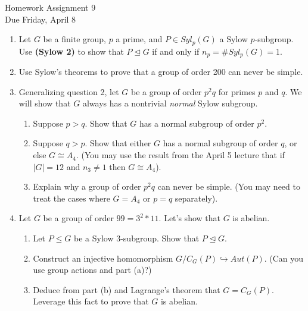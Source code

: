 \documentclass[11pt]{article}
\begin{document}
\begin{center}
\Large {Homework Assignment 9}\\
\small {Due Friday, April 8}
\end{center}
\begin{enumerate}
\item Let $G$ be a finite group, $p$ a prime, and $P\in Syl_p(G)$ a Sylow $p$-subgroup.  Use \textbf{(Sylow 2)} to show that $P\unlhd G$ if and only if $n_p = \#Syl_p(G) = 1$.
\item Use Sylow's theorems to prove that a group of order 200 can never be simple.
  \item{
  Generalizing question 2, let $G$ be a group of order $p^2q$ for primes $p$ and $q$.  We will show that $G$ always has a nontrivial \textit{normal} Sylow subgroup.
  \begin{enumerate}
    \item Suppose $p>q$.  Show that $G$ has a normal subgroup of order $p^2$.
    \item Suppose $q>p$.  Show that either $G$ has a normal subgroup of order $q$, or else $G\cong A_4$.  (You may use the result from the April 5 lecture that if $|G|=12$ and $n_3\not=1$ then $G\cong A_4$).
    \item Explain why a group of order $p^2q$ can never be simple.  (You may need to treat the cases where $G=A_4$ or $p=q$ separately).
  \end{enumerate}
  }
\item Let $G$ be a group of order $99 = 3^2 * 11$.  Let's show that $G$ is abelian.
\begin{enumerate}
\item  Let $P\le G$ be a Sylow 3-subgroup.  Show that $P\unlhd G$.
\item Construct an injective homomorphism $G/C_G(P)\hookrightarrow Aut(P)$.  (Can you use group actions and part (a)?)
\item Deduce from part (b) and Lagrange's theorem that $G=C_G(P)$.  Leverage this fact to prove that $G$ is abelian.
\end{enumerate}
\end{enumerate}
\end{document}
